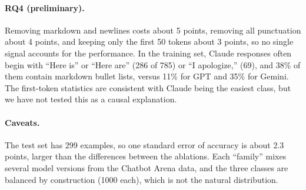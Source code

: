 \paragraph{RQ4 (preliminary).} Removing markdown and newlines costs about 5 points, removing all punctuation about 4 points, and keeping only the first 50 tokens about 3 points, so no single signal accounts for the performance. In the training set, Claude responses often begin with ``Here is'' or ``Here are'' (286 of 785) or ``I apologize,'' (69), and 38\% of them contain markdown bullet lists, versus 11\% for GPT and 35\% for Gemini. The first-token statistics are consistent with Claude being the easiest class, but we have not tested this as a causal explanation.

\paragraph{Caveats.} The test set has 299 examples, so one standard error of accuracy is about 2.3 points, larger than the differences between the ablations. Each ``family'' mixes several model versions from the Chatbot Arena data, and the three classes are balanced by construction (1000 each), which is not the natural distribution.
